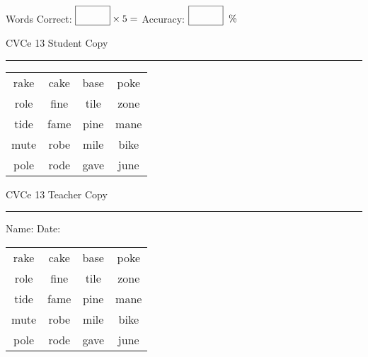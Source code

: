 \documentclass{memoir}
\begin{document}
\small

Words Correct: $\fbox{\phantom{\huge 100}} \times 5 = $ Accuracy: $\fbox{\phantom{\huge 100}}\;\; \%$ 

\vfill

\newpage


\footnotesize \noindent
CVCe 13 \hfill Student Copy
\smallskip
\hrule

\Large

\setlength{\tabcolsep}{14pt}
\def\arraystretch{2}

{\selectfont


\begin{vplace}[0.5]
\begin{center}
\begin{tabular}{cccc}
rake & cake & base & poke \\
role & fine & tile & zone \\
tide & fame & pine & mane \\
mute & robe & mile & bike \\
pole & rode & gave & june \\
\end{tabular}
\end{center}
\end{vplace}

}

\newpage

\footnotesize \noindent
CVCe 13 \hfill Teacher Copy
\smallskip
\hrule

\small

\vfill

\noindent
Name: \underline{\hspace{1.75in}} \hfill Date: \underline{\hspace{1in}}

\Large

{\selectfont


\begin{vplace}[0.5]
\begin{center}
\begin{tabular}{cccc}
rake & cake & base & poke \\
role & fine & tile & zone \\
tide & fame & pine & mane \\
mute & robe & mile & bike \\
pole & rode & gave & june \\
\end{tabular}
\end{center}
\end{vplace}



}
\end{document}
